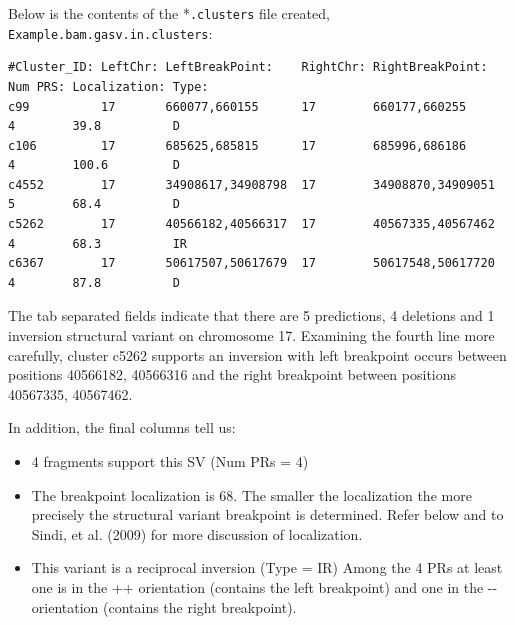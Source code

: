 \documentclass[11pt]{article}
\begin{document}
Below is the contents of the *\verb+.clusters+ file created, \verb+Example.bam.gasv.in.clusters+:

{ \scriptsize
\begin{Verbatim}[frame=single]
#Cluster_ID: LeftChr: LeftBreakPoint:    RightChr: RightBreakPoint:   Num PRS: Localization: Type:
c99          17       660077,660155      17        660177,660255      4        39.8          D
c106         17       685625,685815      17        685996,686186      4        100.6         D
c4552        17       34908617,34908798  17        34908870,34909051  5        68.4          D
c5262        17       40566182,40566317  17        40567335,40567462  4        68.3          IR
c6367        17       50617507,50617679  17        50617548,50617720  4        87.8          D
\end{Verbatim}
}
The tab separated fields indicate that there are 5 predictions, 4 deletions and 1 
inversion structural variant on chromosome 17. Examining the fourth line more carefully, cluster c5262 supports an inversion with left breakpoint occurs between positions 40566182, 40566316 and the 
right breakpoint between positions 40567335, 40567462.

In addition, the final columns tell us:
\begin{itemize}
\item 4 fragments support this SV (Num PRs = 4)
\item The breakpoint localization is 68. 
		The smaller the localization the more precisely the
		structural variant breakpoint is determined. Refer below and to Sindi, et al. (2009)  for more discussion 
		of localization.
\item This variant is a reciprocal inversion (Type = IR)
		Among the 4 PRs at least one is in the ++ orientation 
		(contains the left breakpoint) and one in the 
		-{}- orientation (contains the right breakpoint). 
\end{itemize}
\end{document}
